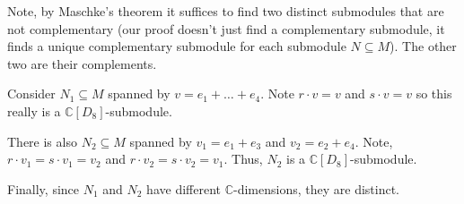 \documentclass[12pt]{article}
\begin{document}
Note, by Maschke's theorem it suffices to find two distinct submodules that are not complementary (our proof doesn't just find a complementary submodule, it finds a unique complementary submodule for each submodule $N \subseteq M$). The other two are their complements.

Consider $N_{1} \subseteq M$ spanned by $v = e_{1} + \dots + e_{4}$. Note $r \cdot v = v$ and $s \cdot v = v$ so this really is a $\mathbb{C}[D_{8}]$-submodule.

There is also $N_{2} \subseteq M$ spanned by $v_{1} = e_{1} + e_{3}$ and $v_{2} = e_{2} + e_{4}$. Note, $r \cdot v_{1} = s \cdot v_{1} = v_{2}$ and $r \cdot v_{2} = s \cdot v_{2} = v_{1}$. Thus, $N_{2}$ is a $\mathbb{C}[D_{8}]$-submodule.

Finally, since $N_{1}$ and $N_{2}$ have different $\mathbb{C}$-dimensions, they are distinct.


\newpage

\end{document}
